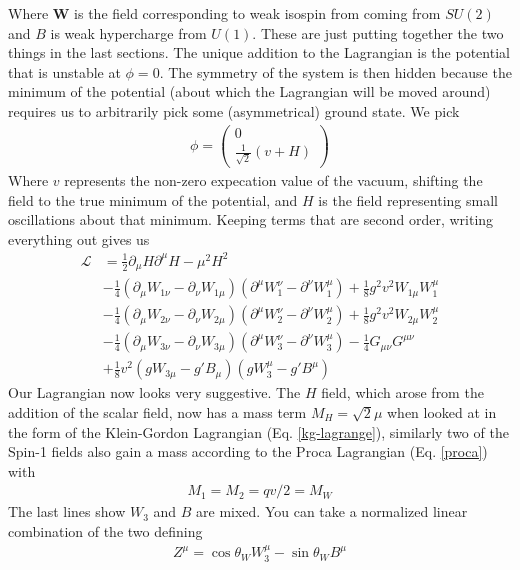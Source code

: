 Where $\textbf{W}$ is the field corresponding to weak isospin from coming from $SU(2)$ and $B$ is weak hypercharge from $U(1)$. These are just putting together the two things in the last sections. The unique addition to the Lagrangian is the potential that is unstable at $\phi = 0$. The symmetry of the system is then hidden because the minimum of the potential (about which the Lagrangian will be moved around) requires us to arbitrarily pick some (asymmetrical) ground state. We pick
\begin{align}\label{higgs_vacuum}
\phi = \begin{pmatrix}
0\\
\frac{1}{\sqrt{2}}(v+H)
\end{pmatrix}
\end{align}
Where $v$ represents the non-zero expecation value of the vacuum, shifting the field to the true minimum of the potential, and $H$ is the field representing small oscillations about that minimum. Keeping terms that are second order, writing everything out gives us
\begin{align}\label{higgs-lagrangian}
\mathcal{L} &= \frac{1}{2}\partial_\mu H\partial^\mu H -\mu^2H^2\\
&-\frac{1}{4}(\partial_\mu W_{1\nu} - \partial_\nu W_{1\mu})(\partial^\mu W^\nu_{1} - \partial^\nu W^\mu_{1}) +\frac{1}{8}g^2v^2W_{1\mu}W^\mu_1\\
&-\frac{1}{4}(\partial_\mu W_{2\nu} - \partial_\nu W_{2\mu})(\partial^\mu W^\nu_{2} - \partial^\nu W^\mu_{2}) +\frac{1}{8}g^2v^2W_{2\mu}W^\mu_2\\
&-\frac{1}{4}(\partial_\mu W_{3\nu} - \partial_\nu W_{3\mu})(\partial^\mu W^\nu_{3} - \partial^\nu W^\mu_{3}) - \frac{1}{4}G_{\mu\nu}G^{\mu\nu}\\
&+\frac{1}{8}v^2(gW_{3\mu}-g'B_\mu)(gW_3^\mu - g'B^\mu)
\end{align}
Our Lagrangian now looks very suggestive. The $H$ field, which arose from the addition of the scalar field, now has a mass term $M_H = \sqrt{2}\mu$ when looked at in the form of the Klein-Gordon Lagrangian (Eq. \ref{kg-lagrange}), similarly two of the Spin-1 fields also gain a mass according to the Proca Lagrangian (Eq. \ref{proca}) with
\begin{align}
M_1 = M_2 = qv/2 = M_W
\end{align}
The last lines show $W_3$ and $B$ are mixed. You can take a normalized linear combination of the two defining
\begin{align}
Z^\mu = \cos\theta_W W_3^\mu -\sin\theta_W B^\mu
\end{align}
